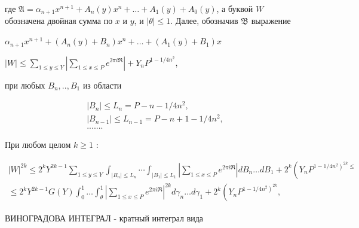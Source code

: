 \documentclass[10pt]{article}
\begin{document}
где $\mathfrak{A}=\alpha_{n+1} x^{n+1}+A_{n}(y) x^{n}+\ldots+A_{1}(y)+A_{0}(y)$, а буквой $W$ обозначена двойная сумма по $x$ и $y$, и $|\theta| \leqslant 1$. Далее, обозначив $\mathfrak{B}$ выражение



$\alpha_{n+1} x^{n+1}+\left(A_{n}(y)+B_{n}\right) x^{n}+\ldots+\left(A_{1}(y)+B_{1}\right) x$



$|W| \leqslant \sum_{1 \leqslant y \leqslant Y}\left|\sum_{1 \leqslant x \leqslant P} e^{2 \pi i \Re}\right|+Y_{n} P^{1-1 / 4 n^{2}}$,



при любых $B_{n}, . ., B_{1}$ из области



\[

\begin{gathered}

\left|B_{n}\right| \leqslant L_{n}=P-n-1 / 4 n^{2}, \\

\left|B_{n-1}\right| \leqslant L_{n-1}=P-n+1-1 / 4 n^{2}, \\

. . . . . . .

\end{gathered}

\]



При любом целом $k \geqslant 1$ :



\[

\begin{array}{r}

|W|^{2 k} \leqslant 2^{k} Y^{2 k-1} \sum_{1 \leqslant y \leqslant Y} \int_{\left|B_{n}\right| \leqslant L_{n}} \cdots \int_{\left|B_{1}\right| \leqslant L_{1}}\left|\sum_{1 \leqslant x \leqslant P} e^{2 \pi i \Re}\right| d B_{n} \ldots d B_{1}+2^{k}\left(Y_{n} P^{\left.1-1 / 4 n^{2}\right)^{2 k} \leqslant}\right. \\

\leqslant 2^{k} Y^{2 k-1} G(Y) \int_{0}^{1} \ldots \int_{\theta}^{1}\left|\sum_{1 \leqslant x \leqslant P} e^{2 \pi i \mathfrak{R}}\right|^{2 k} d \gamma_{n} \ldots d \gamma_{1}+2^{k}\left(Y_{n} P^{\left.1-1 / 4 n^{2}\right)^{2 k}},\right.

\end{array}

\]



ВИНОГРАДОВА ИНТЕГРАЛ - кратный интеграл вида
\end{document}
